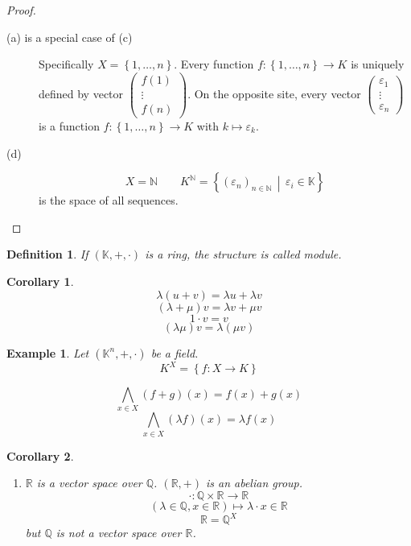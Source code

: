 \documentclass[a4paper,landscape,twocolumn]{article}
\newcommand\set[1]{\left\{#1\right\}}
\newcommand\setdef[2]{\left\{#1\,\middle|\,#2\right\}}
\newtheorem{defi}{Definition}[section]
\newtheorem{ex}{Example}[section]
\newtheorem{cor}{Corollary}[section]
\begin{document}
\begin{proof}
  \begin{description}
    \item[(a) is a special case of (c)]
      Specifically $X = \set{1, \ldots, n}$.
      Every function $f: \set{1, \ldots, n} \rightarrow K$ is uniquely defined
      by vector $\begin{pmatrix} f(1) \\ \vdots \\ f(n) \end{pmatrix}$.
      On the opposite site, every vector
      $\begin{pmatrix} \varepsilon_1 \\ \vdots \\ \varepsilon_n \end{pmatrix}$
      is a function $f: \set{1, \ldots, n} \rightarrow K$ with $k \mapsto \varepsilon_k$.
    \item[(d)]
      \[ X = \mathbb N \qquad K^{\mathbb N} = \setdef{(\varepsilon_n)_{n \in \mathbb N}}{\varepsilon_i \in \mathbb K} \]
      is the space of all sequences.
  \end{description}
\end{proof}

\begin{defi}
  If $(\mathbb K, +, \cdot)$ is a ring, the structure is called \emph{module}.
\end{defi}

\begin{cor}
  \[ \lambda (u + v) = \lambda u + \lambda v \]
  \[ (\lambda + \mu) v = \lambda v + \mu v \]
  \[ 1 \cdot v = v \]
  \[ (\lambda \mu) v = \lambda (\mu v) \]
\end{cor}

\begin{ex}
  Let $(\mathbb K^n, +, \cdot)$ be a field.
  \[ K^X = \set{f: X \rightarrow K} \]

  \[ \bigwedge_{x \in X} (f + g)(x) = f(x) + g(x) \]
  \[ \bigwedge_{x \in X} (\lambda f)(x) = \lambda f(x) \]
\end{ex}

\begin{cor}
  \begin{enumerate}
    \item[(e)]
      $\mathbb R$ is a vector space over $\mathbb Q$.
      $(\mathbb R, +)$ is an abelian group.
      \[ \cdot: \mathbb Q \times \mathbb R \rightarrow \mathbb R \]
      \[ (\lambda \in \mathbb Q, x \in \mathbb R) \mapsto \lambda \cdot x \in \mathbb R \]
      \[ \mathbb R = \mathbb Q^X \]
      but $\mathbb Q$ is \emph{not} a vector space over $\mathbb R$.
  \end{enumerate}
\end{cor}
\end{document}
